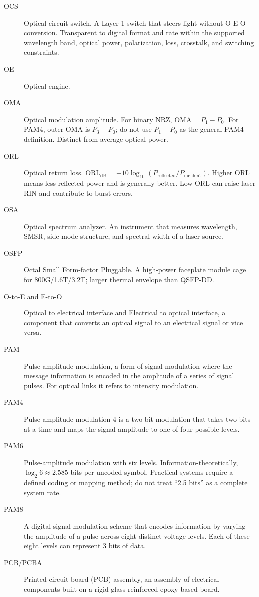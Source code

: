 \begin{description}
\item[OCS] Optical circuit switch. A Layer-1 switch that steers light without O-E-O conversion. Transparent to digital format and rate within the supported wavelength band, optical power, polarization, loss, crosstalk, and switching constraints.
\item[OE] Optical engine.
\item[OMA] Optical modulation amplitude. For binary NRZ, $\mathrm{OMA}=P_1-P_0$. For PAM4, outer OMA is $P_3-P_0$; do not use $P_1-P_0$ as the general PAM4 definition. Distinct from average optical power.
\item[ORL] Optical return loss.
$\mathrm{ORL}_\mathrm{dB}=-10\log_{10}(P_\mathrm{reflected}/P_\mathrm{incident})$.
Higher ORL means less reflected power and is generally better. Low ORL can raise laser RIN and contribute to burst errors.
\item[OSA] Optical spectrum analyzer. An instrument that measures wavelength, SMSR, side-mode structure, and spectral width of a laser source.
\item[OSFP] Octal Small Form-factor Pluggable. A high-power faceplate module cage for 800G/1.6T/3.2T; larger thermal envelope than QSFP-DD.
\item[O-to-E and E-to-O] Optical to electrical interface and Electrical to optical interface, a component that converts an optical signal to an electrical signal or vice versa.
\item[PAM] Pulse amplitude modulation, a form of signal modulation where the message information is encoded in the amplitude of a series of signal pulses. For optical links it refers to intensity modulation.
\item[PAM4] Pulse amplitude modulation-4 is a two-bit modulation that takes two bits at a time and maps the signal amplitude to one of four possible levels.
\item[PAM6] Pulse-amplitude modulation with six levels. Information-theoretically, $\log_2 6\approx2.585$ bits per uncoded symbol. Practical systems require a defined coding or mapping method; do not treat ``2.5 bits'' as a complete system rate.
\item[PAM8] A digital signal modulation scheme that encodes information by varying the amplitude of a pulse across eight distinct voltage levels. Each of these eight levels can represent 3 bits of data.
\item[PCB/PCBA] Printed circuit board (PCB) assembly, an assembly of electrical components built on a rigid glass-reinforced epoxy-based board.

\end{description}
